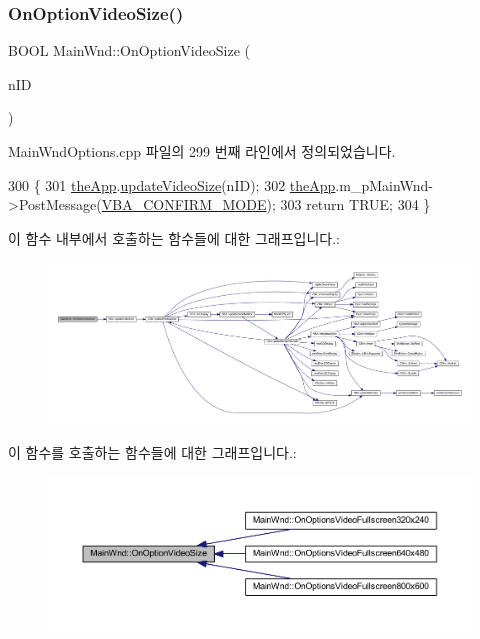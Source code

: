 \subsubsection{\texorpdfstring{On\+Option\+Video\+Size()}{OnOptionVideoSize()}}
{\footnotesize\ttfamily B\+O\+OL Main\+Wnd\+::\+On\+Option\+Video\+Size (\begin{DoxyParamCaption}\item[{U\+I\+NT}]{n\+ID }\end{DoxyParamCaption})}



Main\+Wnd\+Options.\+cpp 파일의 299 번째 라인에서 정의되었습니다.


\begin{DoxyCode}
300 \{
301     \mbox{\hyperlink{_v_b_a_8cpp_a8095a9d06b37a7efe3723f3218ad8fb3}{theApp}}.\mbox{\hyperlink{class_v_b_a_afe121e9ee080eca73146eb339408a148}{updateVideoSize}}(nID);
302     \mbox{\hyperlink{_v_b_a_8cpp_a8095a9d06b37a7efe3723f3218ad8fb3}{theApp}}.m\_pMainWnd->PostMessage(\mbox{\hyperlink{_main_wnd_options_8cpp_a583b057d2cc74711df7dc28e1b185339}{VBA\_CONFIRM\_MODE}});
303     \textcolor{keywordflow}{return} TRUE;
304 \}
\end{DoxyCode}
이 함수 내부에서 호출하는 함수들에 대한 그래프입니다.\+:
\nopagebreak
\begin{figure}[H]
\begin{center}
\leavevmode
\includegraphics[width=350pt]{class_main_wnd_a3db1b6ad5af63ac2c3476868c015f6aa_cgraph}
\end{center}
\end{figure}
이 함수를 호출하는 함수들에 대한 그래프입니다.\+:
\nopagebreak
\begin{figure}[H]
\begin{center}
\leavevmode
\includegraphics[width=350pt]{class_main_wnd_a3db1b6ad5af63ac2c3476868c015f6aa_icgraph}
\end{center}
\end{figure}
\mbox{\label{class_main_wnd_a0c100c54d2e6d48fa3f68d2da1609e65}} 
